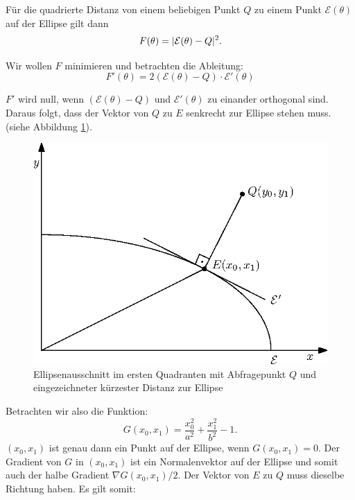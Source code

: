 Für die quadrierte Distanz von einem beliebigen Punkt $Q$ zu einem Punkt $\mathcal{E}(\theta)$ auf der Ellipse gilt dann
\begin{equation}
	F(\theta) = \lvert\mathcal{E}(\theta) - Q\rvert^2.
\end{equation}

Wir wollen $F$ minimieren und betrachten die Ableitung:
\begin{equation}
F'(\theta) = 2\left(\mathcal{E}(\theta) - Q\right) \cdot \mathcal{E}'(\theta)
\end{equation}

$F'$ wird null, wenn $\left(\mathcal{E}(\theta) - Q\right)$ und $ \mathcal{E}'(\theta)$ zu einander orthogonal sind. Daraus folgt, dass der Vektor von $Q$ zu $E$ senkrecht zur Ellipse stehen muss.  (siehe Abbildung \ref{fig:ellipseDist}). 


\begin{figure}[!htb]
	\centering
	\includegraphics[scale=.9]{images/ellipseQuery.eps}
	\caption{Ellipsenausschnitt im ersten Quadranten mit Abfragepunkt $Q$ und eingezeichneter kürzester Distanz zur Ellipse}
	\label{fig:ellipseDist}
\end{figure}

Betrachten wir also die Funktion:
\begin{equation} \label{eq:ellipseDistEq}
	G(x_0,x_1) = \frac{x_0^2}{a^2} + \frac{x_1^2}{b^2} - 1.
\end{equation}
$(x_0,x_1)$ ist genau dann ein Punkt auf der Ellipse, wenn $G(x_0,x_1) = 0$. Der Gradient von $G$ in $(x_0,x_1)$ ist ein Normalenvektor auf der Ellipse und somit auch der halbe Gradient $\nabla G(x_0,x_1)/2$. Der Vektor von $E$ zu $Q$ muss dieselbe Richtung haben. Es gilt somit:

